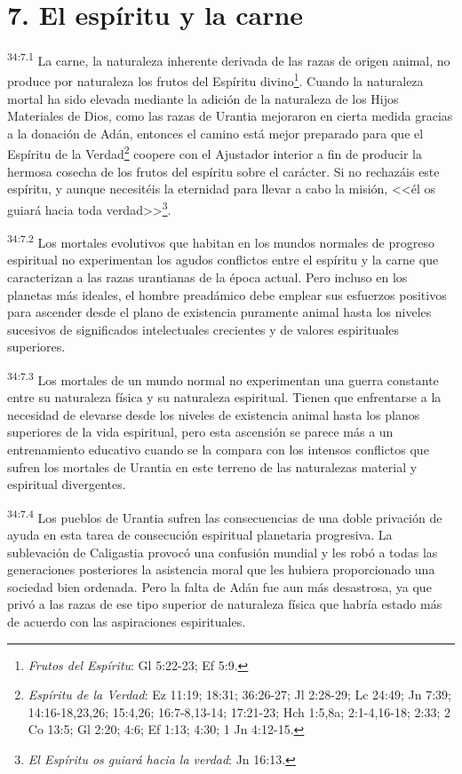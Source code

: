 \section*{7. El espíritu y la carne}
\par
\textsuperscript{34:7.1} La carne, la naturaleza inherente derivada de las razas de origen animal, no produce por naturaleza los frutos del Espíritu divino\footnote{\textit{Frutos del Espíritu}: Gl 5:22-23; Ef 5:9.}. Cuando la naturaleza mortal ha sido elevada mediante la adición de la naturaleza de los Hijos Materiales de Dios, como las razas de Urantia mejoraron en cierta medida gracias a la donación de Adán, entonces el camino está mejor preparado para que el Espíritu de la Verdad\footnote{\textit{Espíritu de la Verdad}: Ez 11:19; 18:31; 36:26-27; Jl 2:28-29; Lc 24:49; Jn 7:39; 14:16-18,23,26; 15:4,26; 16:7-8,13-14; 17:21-23; Hch 1:5,8a; 2:1-4,16-18; 2:33; 2 Co 13:5; Gl 2:20; 4:6; Ef 1:13; 4:30; 1 Jn 4:12-15.} coopere con el Ajustador interior a fin de producir la hermosa cosecha de los frutos del espíritu sobre el carácter. Si no rechazáis este espíritu, y aunque necesitéis la eternidad para llevar a cabo la misión, <<él os guiará hacia toda verdad>>\footnote{\textit{El Espíritu os guiará hacia la verdad}: Jn 16:13.}.

\par
\textsuperscript{34:7.2} Los mortales evolutivos que habitan en los mundos normales de progreso espiritual no experimentan los agudos conflictos entre el espíritu y la carne que caracterizan a las razas urantianas de la época actual. Pero incluso en los planetas más ideales, el hombre preadámico debe emplear sus esfuerzos positivos para ascender desde el plano de existencia puramente animal hasta los niveles sucesivos de significados intelectuales crecientes y de valores espirituales superiores.

\par
\textsuperscript{34:7.3} Los mortales de un mundo normal no experimentan una guerra constante entre su naturaleza física y su naturaleza espiritual. Tienen que enfrentarse a la necesidad de elevarse desde los niveles de existencia animal hasta los planos superiores de la vida espiritual, pero esta ascensión se parece más a un entrenamiento educativo cuando se la compara con los intensos conflictos que sufren los mortales de Urantia en este terreno de las naturalezas material y espiritual divergentes.

\par
\textsuperscript{34:7.4} Los pueblos de Urantia sufren las consecuencias de una doble privación de ayuda en esta tarea de consecución espiritual planetaria progresiva. La sublevación de Caligastia provocó una confusión mundial y les robó a todas las generaciones posteriores la asistencia moral que les hubiera proporcionado una sociedad bien ordenada. Pero la falta de Adán fue aun más desastrosa, ya que privó a las razas de ese tipo superior de naturaleza física que habría estado más de acuerdo con las aspiraciones espirituales.

